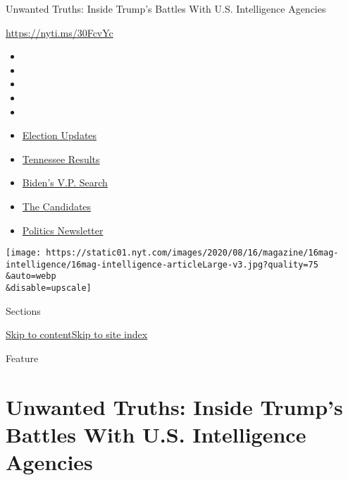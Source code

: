 Unwanted Truths: Inside Trump's Battles With U.S. Intelligence Agencies

\href{https://nyti.ms/30FcvYc}{https://nyti.ms/30FcvYc}

\begin{itemize}
\item
\item
\item
\item
\item
\end{itemize}

\begin{itemize}
\item
  \href{https://www.nytimes.com/2020/08/07/us/elections/biden-vs-trump.html?action=click\&pgtype=Article\&state=default\&region=TOP_BANNER\&context=storylines_menu}{Election
  Updates}
\item
  \href{https://www.nytimes.com/interactive/2020/08/06/us/elections/results-tennessee-primary-elections.html?action=click\&pgtype=Article\&state=default\&region=TOP_BANNER\&context=storylines_menu}{Tennessee
  Results}
\item
  \href{https://www.nytimes.com/article/biden-vice-president-2020.html?action=click\&pgtype=Article\&state=default\&region=TOP_BANNER\&context=storylines_menu}{Biden's
  V.P. Search}
\item
  \href{https://www.nytimes.com/interactive/2019/us/politics/2020-presidential-candidates.html?action=click\&pgtype=Article\&state=default\&region=TOP_BANNER\&context=storylines_menu}{The
  Candidates}
\item
  \href{https://www.nytimes.com/newsletters/politics?action=click\&pgtype=Article\&state=default\&region=TOP_BANNER\&context=storylines_menu}{Politics
  Newsletter}
\end{itemize}

\texttt{[image: https://static01.nyt.com/images/2020/08/16/magazine/16mag-intelligence/16mag-intelligence-articleLarge-v3.jpg?quality=75\\\&auto=webp\\\&disable=upscale]}

Sections

\protect\hyperlink{site-content}{Skip to
content}\protect\hyperlink{site-index}{Skip to site index}

Feature

\hypertarget{unwanted-truths-inside-trumps-battles-with-us-intelligence-agencies}{%
\section{Unwanted Truths: Inside Trump's Battles With U.S. Intelligence
Agencies}\label{unwanted-truths-inside-trumps-battles-with-us-intelligence-agencies}}

